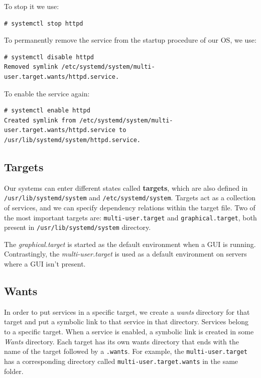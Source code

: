 To stop it we use:

\vspace{-15pt}
\begin{verbatim}
# systemctl stop httpd
\end{verbatim}
\vspace{-10pt}

To permanently remove the service from the startup procedure of our OS, we use:

\vspace{-15pt}
\begin{verbatim}
# systemctl disable httpd
Removed symlink /etc/systemd/system/multi-user.target.wants/httpd.service.
\end{verbatim}
\vspace{-10pt}

To enable the service again:

\vspace{-15pt}
\begin{verbatim}
# systemctl enable httpd
Created symlink from /etc/systemd/system/multi-user.target.wants/httpd.service to /usr/lib/systemd/system/httpd.service.
\end{verbatim}
\vspace{-10pt}

\subsection{Targets}
Our systems can enter different states called \textbf{targets}, which are also defined in \verb|/usr/lib/systemd/system| and \verb|/etc/systemd/system|. Targets act as a collection of services, and we can specify dependency relations within the target file. Two of the most important targets are: \verb|multi-user.target| and \verb|graphical.target|, both present in \verb|/usr/lib/systemd/system| directory. 

The \textit{graphical.target} is started as the default environment when a GUI is running. Contrastingly, the \textit{multi-user.target} is used as a default environment on servers where a GUI isn't present. 

\subsection{Wants}
In order to put services in a specific target, we create a \textit{wants} directory for that target and put a symbolic link to that service in that directory. Services belong to a specific target. When a service is enabled, a symbolic link is created in some \textit{Wants} directory. Each target has its own wants directory that ends with the name of the target followed by a \verb|.wants|. For example, the \verb|multi-user.target| has a corresponding directory called \verb|multi-user.target.wants| in the same folder. 

